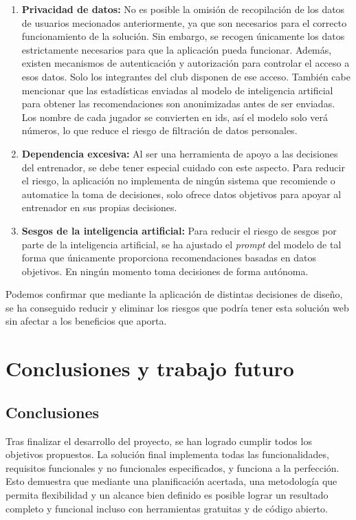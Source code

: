 \begin{enumerate}
  \item \textbf{Privacidad de datos:} No es posible la omisión de recopilación de los datos de usuarios mecionados anteriormente, ya que son necesarios para el correcto funcionamiento de la solución. Sin embargo, se recogen únicamente los datos estrictamente necesarios para que la aplicación pueda funcionar. Además, existen mecanismos de autenticación y autorización para controlar el acceso a esos datos. Solo los integrantes del club disponen de ese acceso. También cabe mencionar que las estadísticas enviadas al modelo de inteligencia artificial para obtener las recomendaciones son anonimizadas antes de ser enviadas. Los nombre de cada jugador se convierten en ids, así el modelo solo verá números, lo que reduce el riesgo de filtración de datos personales.
  \item \textbf{Dependencia excesiva:} Al ser una herramienta de apoyo a las decisiones del entrenador, se debe tener especial cuidado con este aspecto. Para reducir el riesgo, la aplicación no implementa de ningún sistema que recomiende o automatice la toma de decisiones, solo ofrece datos objetivos para apoyar al entrenador en sus propias decisiones.
  \item \textbf{Sesgos de la inteligencia artificial:} Para reducir el riesgo de sesgos por parte de la inteligencia artificial, se ha ajustado el \textit{prompt} del modelo de tal forma que únicamente proporciona recomendaciones basadas en datos objetivos. En ningún momento toma decisiones de forma autónoma.
\end{enumerate}

Podemos confirmar que mediante la aplicación de distintas decisiones de diseño, se ha conseguido reducir y eliminar los riesgos que podría tener esta solución web sin afectar a los beneficios que aporta.

\chapter{Conclusiones y trabajo futuro}

\section{Conclusiones}

Tras finalizar el desarrollo del proyecto, se han logrado cumplir todos los objetivos propuestos. La solución final implementa todas las funcionalidades, requisitos funcionales y no funcionales especificados, y funciona a la perfección. Esto demuestra que mediante una planificación acertada, una metodología que permita flexibilidad y un alcance bien definido es posible lograr un resultado completo y funcional incluso con herramientas gratuitas y de código abierto.


